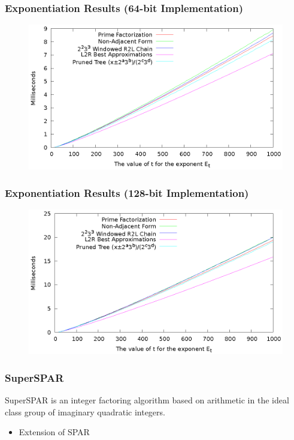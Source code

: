 \documentclass{beamer}
\begin{document}
\begin{frame}
\frametitle{Exponentiation Results (64-bit Implementation)}

\begin{figure}
\includegraphics[scale=0.86]{winners-64}
\end{figure}

\end{frame}

\begin{frame}
\frametitle{Exponentiation Results (128-bit Implementation)}

\begin{figure}
\includegraphics[scale=0.86]{winners-128}
\end{figure}

\end{frame}

\begin{frame}
\frametitle{SuperSPAR}

SuperSPAR is an integer factoring algorithm based on arithmetic in the ideal class group of imaginary quadratic integers.
\begin{itemize}
\item Extension of SPAR 
\end{itemize}

\end{frame}
\end{document}
